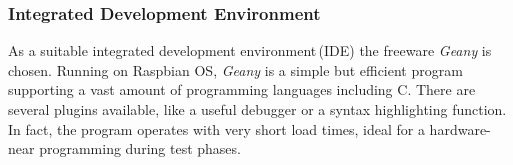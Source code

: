 \subsubsection{Integrated Development Environment}

As a suitable integrated development environment\,(IDE) the freeware \textit{Geany} is chosen.
Running on Raspbian OS, \textit{Geany} is a simple but efficient program supporting a vast amount of programming languages including C. There are several plugins available, like a useful debugger or a syntax highlighting function. In fact, the program operates with very short load times, ideal for a hardware-near programming during test phases.




